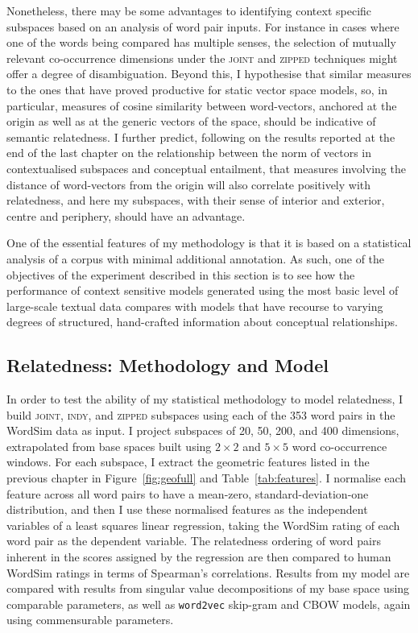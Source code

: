 Nonetheless, there may be some advantages to identifying context specific subspaces based on an analysis of word pair inputs.  For instance in cases where one of the words being compared has multiple senses, the selection of mutually relevant co-occurrence dimensions under the \textsc{joint} and \textsc{zipped} techniques might offer a degree of disambiguation.  Beyond this, I hypothesise that similar measures to the ones that have proved productive for static vector space models, so, in particular, measures of cosine similarity between word-vectors, anchored at the origin as well as at the generic vectors of the space, should be indicative of semantic relatedness.  I further predict, following on the results reported at the end of the last chapter on the relationship between the norm of vectors in contextualised subspaces and conceptual entailment, that measures involving the distance of word-vectors from the origin will also correlate positively with relatedness, and here my subspaces, with their sense of interior and exterior, centre and periphery, should have an advantage.

One of the essential features of my methodology is that it is based on a statistical analysis of a corpus with minimal additional annotation.  As such, one of the objectives of the experiment described in this section is to see how the performance of context sensitive models generated using the most basic level of large-scale textual data compares with models that have recourse to varying degrees of structured, hand-crafted information about conceptual relationships.  

\subsection{Relatedness: Methodology and Model} \label{sec:relmeth}
In order to test the ability of my statistical methodology to model relatedness, I build \textsc{joint}, \textsc{indy}, and \textsc{zipped} subspaces using each of the 353 word pairs in the WordSim data as input.  I project subspaces of 20, 50, 200, and 400 dimensions, extrapolated from base spaces built using $2 \times 2$ and $5 \times 5$ word co-occurrence windows.  For each subspace, I extract the geometric features listed in the previous chapter in Figure~\ref{fig:geofull} and Table~\ref{tab:features}.  I normalise each feature across all word pairs to have a mean-zero, standard-deviation-one distribution, and then I use these normalised features as the independent variables of a least squares linear regression, taking the WordSim rating of each word pair as the dependent variable.  The relatedness ordering of word pairs inherent in the scores assigned by the regression are then compared to human WordSim ratings in terms of Spearman's correlations.  Results from my model are compared with results from singular value decompositions of my base space using comparable parameters, as well as \texttt{word2vec} skip-gram and CBOW models, again using commensurable parameters.

